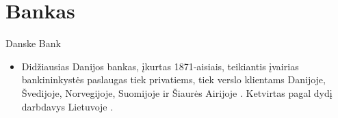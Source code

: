 \section{Bankas}

 \begin{frame}[c]{Danske Bank}
    \begin{minipage}{1\textwidth}
        \begin{itemize}
            \item Didžiausias Danijos bankas, įkurtas 1871‐aisiais, teikiantis įvairias bankininkystės paslaugas tiek privatiems, tiek verslo klientams Danijoje, Švedijoje, Norvegijoje, Suomijoje ir Šiaurės Airijoje \cite{DanskeAbout}. Ketvirtas pagal dydį darbdavys Lietuvoje \cite{DanskeDydis}.
        \end{itemize}
    \end{minipage}
\end{frame}
